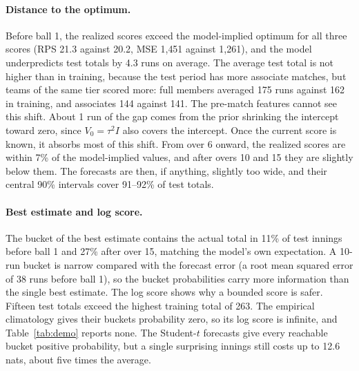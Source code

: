 \documentclass{article}
\newcommand{\1}{\mathbf{1}}
\begin{document}
\paragraph{Distance to the optimum.} Before ball 1, the realized scores exceed the model-implied optimum for all three scores (RPS 21.3 against 20.2, MSE 1{,}451 against 1{,}261), and the model underpredicts test totals by 4.3 runs on average. The average test total is not higher than in training, because the test period has more associate matches, but teams of the same tier scored more: full members averaged 175 runs against 162 in training, and associates 144 against 141. The pre-match features cannot see this shift. About 1 run of the gap comes from the prior shrinking the intercept toward zero, since $V_0 = \tau^2 I$ also covers the intercept. Once the current score is known, it absorbs most of this shift. From over 6 onward, the realized scores are within 7\% of the model-implied values, and after overs 10 and 15 they are slightly below them. The forecasts are then, if anything, slightly too wide, and their central 90\% intervals cover 91--92\% of test totals.

\paragraph{Best estimate and log score.} The bucket of the best estimate contains the actual total in 11\% of test innings before ball 1 and 27\% after over 15, matching the model's own expectation. A 10-run bucket is narrow compared with the forecast error (a root mean squared error of 38 runs before ball 1), so the bucket probabilities carry more information than the single best estimate. The log score shows why a bounded score is safer. Fifteen test totals exceed the highest training total of 263. The empirical climatology gives their buckets probability zero, so its log score is infinite, and Table~\ref{tab:demo} reports none. The Student-$t$ forecasts give every reachable bucket positive probability, but a single surprising innings still costs up to 12.6 nats, about five times the average.






\end{document}
